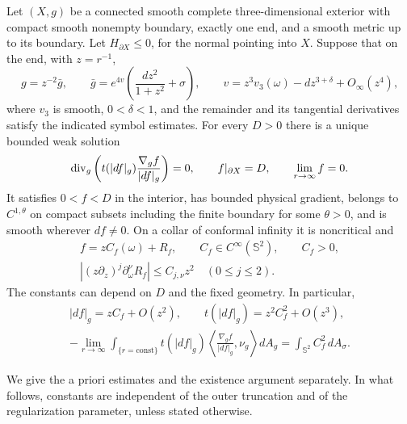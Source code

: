 \begin{theorem}\label{thm:str-stress-dirichlet}
\label{str-pde-fixed-height}
Let $(X,g)$ be a connected smooth complete three-dimensional exterior
with compact smooth nonempty boundary, exactly one end, and a smooth
metric up to its boundary. Let $H_{\partial X}\leq0$, for the normal
pointing into $X$. Suppose that on the end, with $z=r^{-1}$,
\begin{equation}\label{str-pde-prepared-end}
 g=z^{-2}\bar g,\qquad
 \bar g=e^{4v}\left(\frac{dz^2}{1+z^2}+\sigma\right),\qquad
 v=z^3v_3(\omega)-d z^{3+\delta}+O_\infty(z^4),
\end{equation}
where $v_3$ is smooth, $0<\delta<1$, and the remainder and its
tangential derivatives satisfy the indicated symbol estimates.
For every $D>0$ there is a unique bounded weak solution
\begin{equation}\label{str-pde-dirichlet}
 \operatorname{div}_g\left(t(|df|_g)\frac{\nabla_g f}{|df|_g}\right)=0,
 \qquad f|_{\partial X}=D,\qquad \lim_{r\to\infty}f=0.
\end{equation}
It satisfies $0<f<D$ in the interior, has bounded physical gradient,
belongs to $C^{1,\theta}$ on compact subsets including the finite
boundary for some $\theta>0$, and is smooth wherever $df\ne0$.
On a collar of conformal infinity it is noncritical and
\begin{equation}\label{str-pde-end-expansion}
\begin{gathered}
 f=z C_f(\omega)+R_f,\qquad C_f\in C^\infty(\mathbb S^2),
 \qquad C_f>0,\\
 |(z\partial_z)^j\partial_\omega^\nu R_f|
 \leq C_{j,\nu}z^2\quad(0\leq j\leq2).
\end{gathered}
\end{equation}
The constants can depend on $D$ and the fixed geometry. In particular,
\begin{equation}\label{str-pde-end-flux}
 \begin{gathered}
 |df|_g=zC_f+O(z^2),\qquad
 t(|df|_g)=z^2C_f^2+O(z^3),\\
 -\lim_{r\to\infty}\int_{\{r=\mathrm{const}\}}
 t(|df|_g)\left\langle\frac{\nabla_g f}{|df|_g},\nu_g\right\rangle
 dA_g=\int_{\mathbb S^2}C_f^2\,dA_\sigma .
 \end{gathered}
\end{equation}
\end{theorem}

We give the a priori estimates and the existence argument separately.
In what follows, constants are independent of the outer truncation
and of the regularization parameter, unless stated otherwise.

